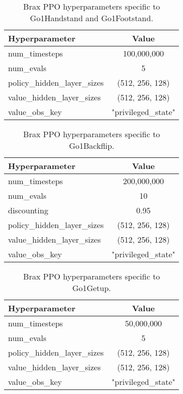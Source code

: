 \begin{table}[ht]
\centering
\begin{tabular}{|l|c|} 
\hline
\textbf{Hyperparameter} & \textbf{Value} \\ \hline
num\_timesteps & 100,000,000 \\ \hline
num\_evals & 5  \\ \hline
policy\_hidden\_layer\_sizes & (512, 256, 128) \\ \hline 
value\_hidden\_layer\_sizes & (512, 256, 128) \\ \hline 
value\_obs\_key & "privileged\_state" \\ \hline
\end{tabular}
\caption{Brax PPO hyperparameters specific to Go1Handstand and Go1Footstand.}
\end{table}

\begin{table}[ht]
\centering
\begin{tabular}{|l|c|} 
\hline
\textbf{Hyperparameter} & \textbf{Value} \\ \hline
num\_timesteps & 200,000,000 \\ \hline
num\_evals & 10  \\ \hline
discounting & 0.95 \\ \hline
policy\_hidden\_layer\_sizes & (512, 256, 128) \\ \hline 
value\_hidden\_layer\_sizes & (512, 256, 128) \\ \hline 
value\_obs\_key & "privileged\_state" \\ \hline
\end{tabular}
\caption{Brax PPO hyperparameters specific to Go1Backflip.}
\end{table}

\begin{table}[ht]
\centering
\begin{tabular}{|l|c|} 
\hline
\textbf{Hyperparameter} & \textbf{Value} \\ \hline
num\_timesteps & 50,000,000 \\ \hline
num\_evals & 5  \\ \hline
policy\_hidden\_layer\_sizes & (512, 256, 128) \\ \hline 
value\_hidden\_layer\_sizes & (512, 256, 128) \\ \hline 
value\_obs\_key & "privileged\_state" \\ \hline
\end{tabular}
\caption{Brax PPO hyperparameters specific to Go1Getup.}
\end{table}

